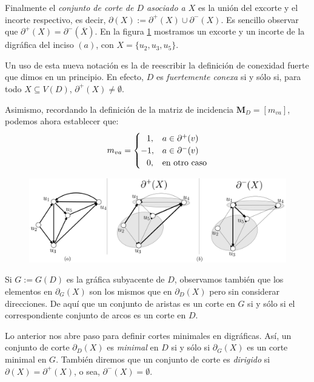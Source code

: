  Finalmente el \textit{conjunto de corte de $D$ asociado a $X$}  es la unión del excorte y el incorte respectivo, es decir, $\partial(X) := \partial^{+}(X) \cup \partial^{-}(X)$. Es sencillo observar que $\partial^{+}(X) = \partial^{-}(\overline{X})$. En la figura \ref{fig:excorteincorte} mostramos un excorte y un incorte de la digráfica del inciso $(a)$, con $X=\{u_{2},u_{3},u_{5}\}$.

 

Un uso de esta nueva notación es la de reescribir la definición de conexidad fuerte que dimos en un principio. En efecto, $D$ es \textit{fuertemente conexa} si y sólo si, para todo $X \subseteq V(D)$, $\partial^{+}(X) \neq \emptyset$. 

Asimismo, recordando la definición de la matriz de incidencia $\mathbf{M}_{D} = [m_{va}]$, podemos ahora establecer que:
\begin{equation} \label{eq:mva}
  m_{va}=
    \begin{cases}
\hspace{0.7em} 1, & a \in \partial^{+}(v)\\ 
-1, & a \in \partial^{-}(v)\\ 
\hspace{0.7em} 0, & \text{en otro caso}
\end{cases}
\end{equation}

 \begin{figure}[H]
    \centering
\includegraphics[scale=0.18]{img/imgchapter2/ExcorteIncorte.jpg}
    \caption{}
    \label{fig:excorteincorte}
\end{figure}

Si $G:=G(D)$ es la gráfica subyacente de $D$, observamos también que los elementos en $\partial_{G}(X)$ son los mismos que en $\partial_{D}(X)$ pero sin considerar direcciones. De aquí que un conjunto de aristas es un corte en $G$ si y sólo si el correspondiente conjunto de arcos es un corte en $D$.

Lo anterior nos abre paso para definir cortes minimales en digráficas. Así, un conjunto de corte $\partial_{D}(X)$ es \textit{minimal}  en $D$ si y sólo si $\partial_{G}(X)$ es un corte minimal en $G$. También diremos que un conjunto de corte es \textit{dirigido} si $\partial(X) = \partial^{+}(X)$, o sea, $\partial^{-}(X)=\emptyset$.

